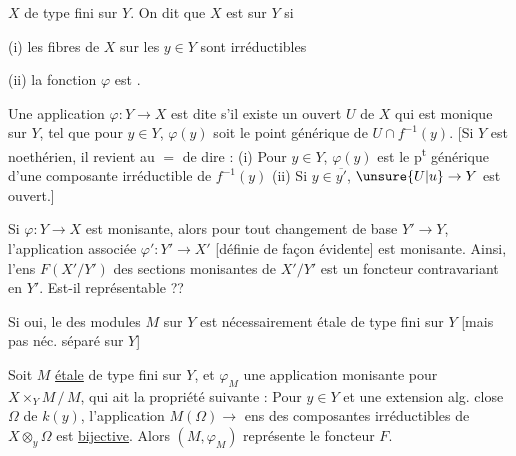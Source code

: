 $X$ de type fini sur $Y$. On dit que $X$ est  sur $Y$ si

(i) les fibres de $X$ sur les $y\in Y$ sont   irréductibles


(ii) la fonction $\varphi$ est .

Une application $\varphi:Y\to X$ est dite  s'il existe un ouvert $U$ de $X$ qui est  monique sur $Y$,
 tel que pour  $y\in Y$,
$\varphi(y)$ soit le point générique de $U\cap f^{-1}(y)$. [Si $Y$ est noethérien, il revient au $=$ de dire : (i) Pour  $y\in Y$,
$\varphi(y)$ est le p\textsuperscript{t} générique d'une composante  irréductible de $f^{-1}(y)$ (ii) Si $y\in\overline{y'}$,
  $\unsure{U|u}\to Y$ est  ouvert.]

Si $\varphi:Y\to X$ est monisante, alors pour tout changement de base $Y'\to Y$, l'application associée $\varphi':Y'\to X'$ [définie de façon évidente] est monisante. Ainsi, l'ens
$F(X'/Y')$ des sections monisantes de $X'/Y'$ est un foncteur contravariant en $Y'$. Est-il représentable ??

Si oui, le  des modules $M$ sur $Y$ est nécessairement étale de type fini sur $Y$ [mais pas néc. séparé sur $Y$]

Soit $M$ \uline{étale} de type fini sur $Y$, et $\varphi_M$ une  application monisante pour $X\times_Y M\,/\,M$, qui ait la propriété suivante : Pour  $y\in Y$ et une extension alg. close $\Omega$ de $k(y)$, l'application $M(\Omega)\to{}$ ens des composantes irréductibles de $X\otimes_y\Omega$ est \uline{bijective}. Alors $(M,\varphi_M)$ représente le foncteur $F$.
